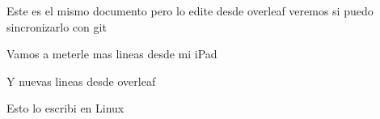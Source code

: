 \documentclass{article}
\begin{document}
	Este  es el mismo documento pero lo edite desde overleaf veremos si  puedo sincronizarlo con git
	
Vamos a meterle mas lineas desde mi iPad

Y nuevas lineas desde overleaf

Esto lo escribi en Linux

 
\end{document}
